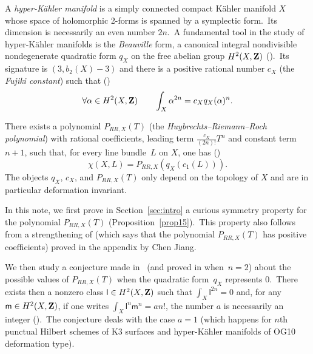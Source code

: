 \documentclass[12pt]{amsart}
\def\Z{{\bf Z}}
\DeclareMathOperator{\td}{td}
\def\hKm{hyper-K\"ahler manifold}
\theoremstyle{remark}
\def\lll{\ensuremath{\mathsf l}}
\def\mm{\ensuremath{\mathsf m}}
\begin{document}
 
A {\em \hKm} is a simply connected compact K\"ahler manifold $X$  whose space of holomorphic 2-forms is spanned by a symplectic form.\ Its dimension  is necessarily an even number $2n$.\ A fundamental tool in the study of \hKm s is the {\em Beauville} form, 
 a canonical integral nondivisible nondegenerate quadratic form $q_X$ on the free abelian group $H^2(X,\Z)$ (\cite[th.~5]{bea}).\ Its signature is $(3,b_2(X)-3)$
 and  there is a positive rational number $c_X$ (the {\em Fujiki constant}) such that (\cite[Theorem~4.7]{fuj})
\begin{equation}\label{defqx}
\forall \alpha\in H^2(X,\Z)\qquad \int_X \alpha^{2n}=c_Xq_X(\alpha)^n.
\end{equation}

There exists a polynomial $ P_{RR,X}(T)$ (the {\em Huybrechts--Riemann--Roch polynomial})  with rational coefficients, leading term $\frac{c_X}{(2n)!}T^n$ and constant term $n+1$, such that, for every line bundle~$L$ on $X$,  one has (\cite[Corollary~3.18]{huy})
\begin{equation}\label{hrr}
\chi(X,L)=P_{RR,X}(q_X(c_1(L)))
.
\end{equation}
The  objects $q_X$, $c_X$, and $ P_{RR,X}(T)$ only depend on  the topology of $X$ and are in particular  deformation invariant.\
 
 In this note, we first prove in Section~\ref{sec:intro} a curious symmetry property for the polynomial $ P_{RR,X}(T)$ (Proposition~\ref{prop15}).\ This property also follows from a strengthening of \cite[Theorem~1.1]{jia} (which says that the polynomial $ P_{RR,X}(T)$ has positive coefficients)
 proved in the appendix by Chen Jiang.
 
 
 
 
  We then study a conjecture made in~\cite[Conjecture~1.4]{dhmv} (and proved in \cite[Theorem~1.5]{dhmv} when~$n=2$) about the possible values of $ P_{RR,X}(T)$ when the quadratic form~$q_X$ represents $0$.\ There exists then a nonzero class $\lll\in H^2(X,\Z)$   such that
$
\int_X\lll^{2n}=0$ and, for any $\mm\in H^2(X,\Z)$, if one writes $\int_X\lll^n\mm^n=a n!$, the number $a$ is necessarily an integer (\cite[Lemma~2.2]{dhmv}).\ The   conjecture deals with the case  $a=1$ (which happens for   $n$th punctual Hilbert schemes of  K3 surfaces and \hKm s of OG10 deformation type).
\end{document}
